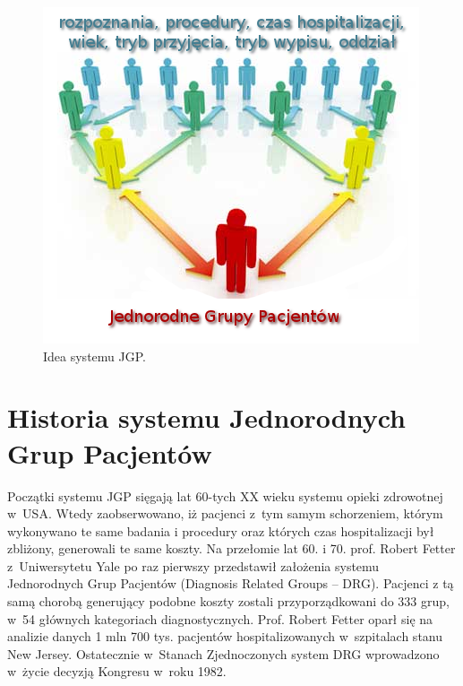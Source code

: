 \vspace*{1cm}
\begin{figure}[!ht]
\centering
\includegraphics[scale=0.8]{images/standarization}
\caption[Rysunek przedstawiający ideę systemu JGP]{Idea systemu JGP.}
\label{img:rysunek_jgp}
\end{figure}


\section{Historia systemu Jednorodnych Grup Pacjentów}
\label{sec:historiaJGP}

Początki systemu JGP sięgają lat 60-tych XX wieku systemu opieki zdrowotnej w~USA. Wtedy zaobserwowano, iż pacjenci z~tym samym schorzeniem, którym wykonywano te same badania i procedury oraz których czas hospitalizacji był zbliżony, generowali te same koszty. Na przełomie lat 60. i 70. prof. Robert Fetter z~Uniwersytetu Yale po raz pierwszy przedstawił założenia systemu Jednorodnych Grup Pacjentów (Diagnosis Related Groups – DRG). Pacjenci z tą samą chorobą generujący podobne koszty zostali przyporządkowani do 333 grup, w~54 głównych kategoriach diagnostycznych. Prof. Robert Fetter oparł się na analizie danych 1 mln 700 tys. pacjentów hospitalizowanych w~szpitalach stanu New Jersey. Ostatecznie w~Stanach Zjednoczonych system DRG wprowadzono w~życie decyzją Kongresu w~roku 1982\cite{kozierkiewicz_jgp}.

